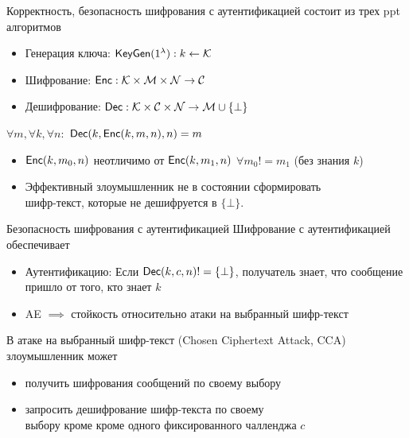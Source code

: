 \documentclass[usenames,dvipsnames,8pt,aspectratio=169]{beamer}
\begin{document}
\begin{frame}{Корректность, безопасность шифрования с аутентификацией }
\Large
{\color{Orange}{Шифрование с аутентификацией (AE)}} состоит из трех ppt алгоритмов
\begin{itemize}
	\itemsep 10pt
	\item Генерация ключа: $\textsf{KeyGen}(1^\lambda): k \leftarrow \mathcal{K}$
	\item Шифрование: $\textsf{Enc}: \mathcal{K} \times \mathcal{M} \times \mathcal{N} \rightarrow \mathcal{C}$
	\item Дешифрование:  $\textsf{Dec}: \mathcal{K} \times \mathcal{C}  \times \mathcal{N} \rightarrow \mathcal{M} \cup \{\bot\}$
\end{itemize}

\vspace{15pt}
{\color{Orange}{Корректность:}} $\forall m, \forall k, \forall n:$ $\textsf{Dec}(k, \textsf{Enc}(k, m,n), n) = m$

\vspace{15pt}
{\color{Orange}{Безопасность (неформально):}}
\begin{itemize}
	\itemsep 10pt
	\item $\textsf{Enc}(k, m_0, n)$ неотличимо от $\textsf{Enc}(k, m_1, n)$ $\forall m_0 != m_1$ (без знания $k$) 
	\item  Эффективный злоумышленник не в состоянии сформировать \\ шифр-текст, которые не дешифруется в $\{\bot\}$.
\end{itemize}

\end{frame}

\begin{frame}{Безопасность шифрования с аутентификацией}
	\Large
	Шифрование с аутентификацией обеспечивает
	\begin{itemize}
		\itemsep 10pt
		\item {\color{Orange}Аутентификацию:} Если $\textsf{Dec}(k, c, n)!=\{\bot\}$, получатель знает, что сообщение пришло от того, кто знает $k$
		\pause
		\item {\color{Orange}AE $\implies$ стойкость относительно атаки на выбранный шифр-текст} 
	\end{itemize}

\vspace{15pt}
В  атаке на выбранный шифр-текст (Chosen Ciphertext Attack, CCA)  злоумышленник может
\begin{itemize}
	\item получить шифрования сообщений по своему выбору
	\item запросить дешифрование {\color{Orange}{любого}} шифр-текста по своему \\ выбору кроме кроме одного фиксированного чалленджа  $c$
\end{itemize}
\end{frame}
\end{document}
